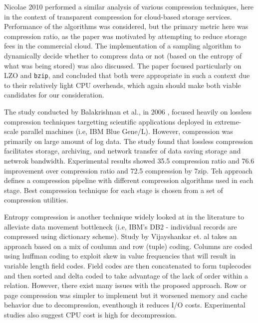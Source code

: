 \documentclass[twocolumn]{article}
\begin{document}
Nicolae 2010 \cite{ref:cloud-comp} performed a similar analysis of various
compression techniques, here in the context of transparent compression
for cloud-based storage services.  Performance of the algorithms
was considered, but the primary metric here was compression ratio, as the
paper was motivated by attempting to reduce storage fees in the commercial
cloud.  The implementation of a sampling algorithm to dynamically decide whether
to compress data or not (based on the entropy of what was being stored) was also
discussed.  The paper focused particularly on LZO and \verb+bzip+,
and concluded that both were appropriate in such a context due to their
relatively light CPU overheads, which again should make both viable candidates
for our consideration.

The study conducted by Balakrishnan et al., in 2006 \cite{ref:lossless-cluster},
focused heavily on lossless compression techniques targetting scientific applications
deployed in extreme-scale parallel machines (i.e, IBM Blue Gene/L). However, 
compression was primarily on large amount of log data. The study found that lossless
compression facilitates storage, archiving, and network transfer of data saving 
storage and netwrok bandwidth. Experimental results showed 35.5%
compression ratio and 76.6%
improvement over compression ratio and 72.5%
compression by 7zip. Teh approach defines a compression pipeline with different 
compression algorithms used in each stage. Best compression technique for each 
stage is chosen from a set of compression utilities.

Entropy compression is another technique widely looked at in the literature 
to alleviate data movement bottleneck (i.e, IBM's DB2 - individual records are 
compressed using dictionary scheme). Study by Vijayshankar et. al 
\cite{ref:entropy-compression} takes an approach based on a mix of coulumn and 
row (tuple) coding. Columns are coded using huffman coding to exploit skew in 
value frequencies that will result in variable length field codes. Field codes 
are then concatenated to form tuplecodes and then sorted and delta coded to take 
advantage of the lack of order within a relation. However, there exist many 
issues with the proposed approach. Row or page compression was simpler to implement 
but it worsened memory and cache behavior due to decompression, eventhough it 
reduces I/O costs. Experimental studies also suggest CPU cost is high for decompression.
\end{document}
